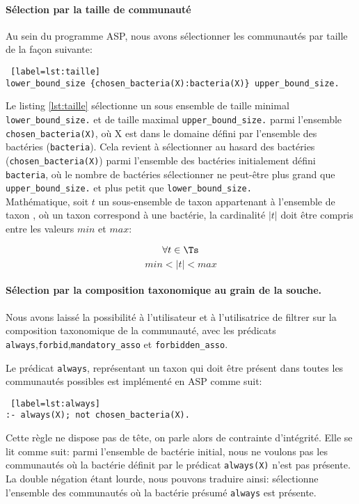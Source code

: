 \documentclass[../main.tex]{subfiles}
\begin{document}
\paragraph*{Sélection par la taille de communauté}
Au sein du programme ASP, nous avons sélectionner les communautés par taille de la façon suivante:
\begin{lstlisting} [label=lst:taille]
lower_bound_size {chosen_bacteria(X):bacteria(X)} upper_bound_size.
\end{lstlisting}

Le listing \ref{lst:taille} sélectionne un sous ensemble de taille minimal \texttt{lower\_bound\_size.} et de taille maximal \texttt{upper\_bound\_size.} parmi l'ensemble \texttt{chosen\_bacteria(X)}, où X est dans le domaine défini par l'ensemble des bactéries (\texttt{bacteria}). Cela revient à sélectionner au hasard des bactéries (\texttt{chosen\_bacteria(X)}) parmi l'ensemble des bactéries initialement défini \texttt{bacteria}, où le nombre de bactéries sélectionner ne peut-être plus grand que \texttt{upper\_bound\_size.} et plus petit que \texttt{lower\_bound\_size.}\\

Mathématique, soit $t$ un sous-ensemble de taxon appartenant à l'ensemble de taxon \Ts, où un taxon correspond à une bactérie, la cardinalité $\vert t \vert $ doit être compris entre les valeurs $min$ et $max$:

\[
\forall t \in \Ts 
\]
\[
min<\vert t \vert <max
\]

\paragraph*{Sélection par la composition taxonomique au grain de la souche.}
Nous avons laissé la possibilité à l'utilisateur et à l'utilisatrice de filtrer sur la composition taxonomique de la communauté, avec les prédicats \texttt{always},\texttt{forbid},\texttt{mandatory\_asso} et \texttt{forbidden\_asso}.  

Le prédicat \texttt{always}, représentant un taxon qui doit être présent dans toutes les communautés possibles est implémenté en ASP comme suit:

\begin{lstlisting} [label=lst:always]
:- always(X); not chosen_bacteria(X).
\end{lstlisting}

Cette règle ne dispose pas de tête, on parle alors de contrainte d'intégrité. Elle se lit comme suit: parmi l'ensemble de bactérie initial, nous ne voulons pas les communautés où la bactérie définit par le prédicat \texttt{always(X)} n'est pas présente. La double négation étant lourde, nous pouvons traduire ainsi: sélectionne l'ensemble des communautés où la bactérie présumé \texttt{always} est présente. 
\end{document}
